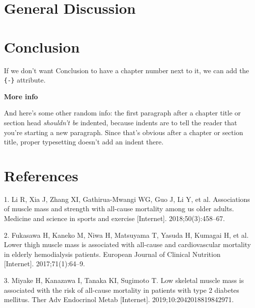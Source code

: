 \documentclass[twoside,10pt]{gihclass} %
\begin{document}
\hypertarget{general-discussion}{%
\chapter{General Discussion}\label{general-discussion}}

\hypertarget{conclusion}{%
\chapter*{Conclusion}\label{conclusion}}

If we don't want Conclusion to have a chapter number next to it, we can add the \texttt{\{-\}} attribute.

\textbf{More info}

And here's some other random info: the first paragraph after a chapter title or section head \emph{shouldn't be} indented, because indents are to tell the reader that you're starting a new paragraph. Since that's obvious after a chapter or section title, proper typesetting doesn't add an indent there.

\backmatter

\hypertarget{references}{%
\chapter*{References}\label{references}}


\noindent

\setlength{\parindent}{-0.20in}
\setlength{\leftskip}{0.20in}
\setlength{\parskip}{8pt}

\hypertarget{refs}{}
\leavevmode\hypertarget{ref-RN2512}{}%
1. Li R, Xia J, Zhang XI, Gathirua-Mwangi WG, Guo J, Li Y, et al. Associations of muscle mass and strength with all-cause mortality among us older adults. Medicine and science in sports and exercise {[}Internet{]}. 2018;50(3):458--67.

\leavevmode\hypertarget{ref-RN2513}{}%
2. Fukasawa H, Kaneko M, Niwa H, Matsuyama T, Yasuda H, Kumagai H, et al. Lower thigh muscle mass is associated with all-cause and cardiovascular mortality in elderly hemodialysis patients. European Journal of Clinical Nutrition {[}Internet{]}. 2017;71(1):64--9.

\leavevmode\hypertarget{ref-RN2514}{}%
3. Miyake H, Kanazawa I, Tanaka KI, Sugimoto T. Low skeletal muscle mass is associated with the risk of all-cause mortality in patients with type 2 diabetes mellitus. Ther Adv Endocrinol Metab {[}Internet{]}. 2019;10:2042018819842971.
\end{document}
